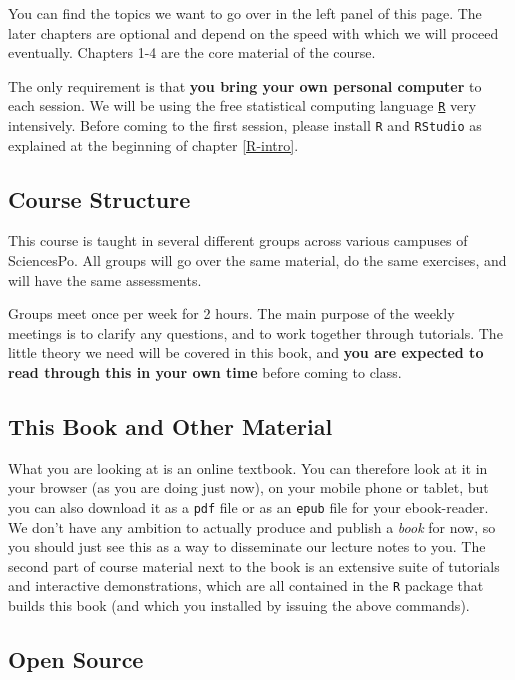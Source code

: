 \documentclass[]{book}
\theoremstyle{definition}
\theoremstyle{definition}
\theoremstyle{definition}
\theoremstyle{remark}
\begin{document}
You can find the topics we want to go over in the left panel of this
page. The later chapters are optional and depend on the speed with which
we will proceed eventually. Chapters 1-4 are the core material of the
course.

The only requirement is that \textbf{you bring your own personal
computer} to each session. We will be using the free statistical
computing language \href{https://www.r-project.org}{\texttt{R}} very
intensively. Before coming to the first session, please install
\texttt{R} and \texttt{RStudio} as explained at the beginning of chapter
\ref{R-intro}.

\subsection*{Course Structure}\label{course-structure}

This course is taught in several different groups across various
campuses of SciencesPo. All groups will go over the same material, do
the same exercises, and will have the same assessments.

Groups meet once per week for 2 hours. The main purpose of the weekly
meetings is to clarify any questions, and to work together through
tutorials. The little theory we need will be covered in this book, and
\textbf{you are expected to read through this in your own time} before
coming to class.

\subsection*{This Book and Other
Material}\label{this-book-and-other-material}

What you are looking at is an online textbook. You can therefore look at
it in your browser (as you are doing just now), on your mobile phone or
tablet, but you can also download it as a \texttt{pdf} file or as an
\texttt{epub} file for your ebook-reader. We don't have any ambition to
actually produce and publish a \emph{book} for now, so you should just
see this as a way to disseminate our lecture notes to you. The second
part of course material next to the book is an extensive suite of
tutorials and interactive demonstrations, which are all contained in the
\texttt{R} package that builds this book (and which you installed by
issuing the above commands).

\subsection*{Open Source}\label{open-source}
\end{document}
